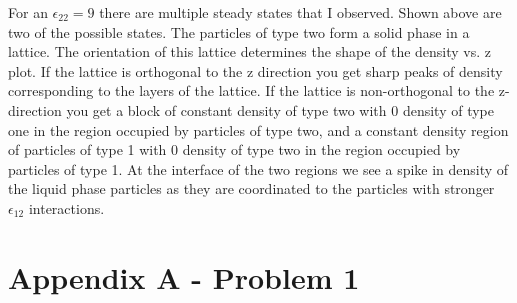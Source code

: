 \documentclass{article}
\begin{document}
		For an  $\epsilon _{22}=9$ there are multiple steady states that I observed. Shown above are two of the possible states. The particles of type two form a solid phase in a lattice. The orientation of this lattice determines the shape of the density vs. z plot. If the lattice is orthogonal to the z direction you get sharp peaks of density corresponding to the layers of the lattice. If the lattice is non-orthogonal to the z-direction you get a block of constant density of type two with 0 density of type one in the region occupied by particles of type two, and a constant density region of particles of type 1 with 0 density of type two in the region occupied by particles of type 1. At the interface of the two regions we see a spike in density of the liquid phase particles as they are coordinated to the particles with stronger $\epsilon _{12}$ interactions.



\newpage

\section*{Appendix A - Problem 1}
\end{document}
